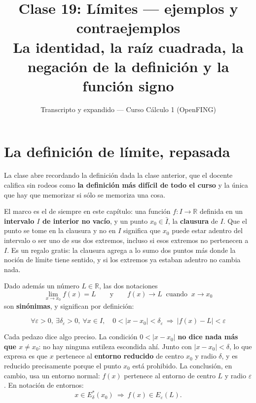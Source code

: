 \documentclass[12pt,a4paper]{article}
\title{\textbf{Clase 19: Límites --- ejemplos y contraejemplos} \\[0.3em]
        \large{La identidad, la raíz cuadrada, la negación de la definición y la función signo}}
\author{Transcripto y expandido --- Curso Cálculo 1 (OpenFING)}
\date{}
\begin{document}
\maketitle
\thispagestyle{empty}
\newpage

\tableofcontents
\newpage

\section{La definición de límite, repasada}

La clase abre recordando la definición dada la clase anterior, que el docente
califica sin rodeos como \textbf{la definición más difícil de todo el curso} y
la única que hay que memorizar si sólo se memoriza una cosa.

El marco es el de siempre en este capítulo: una función $f : I \to \mathbb{R}$
definida en un \textbf{intervalo $I$ de interior no vacío}, y un punto
$x_0 \in \bar I$, la \textbf{clausura} de $I$. Que el punto se tome en la
clausura y no en $I$ significa que $x_0$ puede estar adentro del intervalo o
ser uno de sus dos extremos, incluso si esos extremos no pertenecen a $I$. Es
un regalo gratis: la clausura agrega a lo sumo dos puntos más donde la noción
de límite tiene sentido, y si los extremos ya estaban adentro no cambia nada.

Dado además un número $L \in \mathbb{R}$, las dos notaciones
\[
  \lim_{x \to x_0} f(x) = L
  \qquad \text{y} \qquad
  f(x) \to L \ \text{ cuando } \ x \to x_0
\]
son \textbf{sinónimas}, y significan por definición:

\begin{keybox}
\[
  \boxed{\ \forall \varepsilon > 0,\ \exists \delta_\varepsilon > 0,\
  \forall x \in I,\quad
  0 < |x - x_0| < \delta_\varepsilon \ \Longrightarrow\ |f(x) - L| < \varepsilon\ }
\]
\end{keybox}

Cada pedazo dice algo preciso. La condición $0 < |x - x_0|$ \textbf{no dice
nada más que $x \neq x_0$}: no hay ninguna sutileza escondida ahí. Junto con
$|x-x_0| < \delta$, lo que expresa es que $x$ pertenece al \textbf{entorno
reducido} de centro $x_0$ y radio $\delta$, y es reducido precisamente porque
el punto $x_0$ está prohibido. La conclusión, en cambio, usa un entorno
normal: $f(x)$ pertenece al entorno de centro $L$ y radio $\varepsilon$. En
notación de entornos:
\[
  x \in E^{*}_{\delta}(x_0) \ \Longrightarrow\ f(x) \in E_{\varepsilon}(L).
\]
\end{document}
